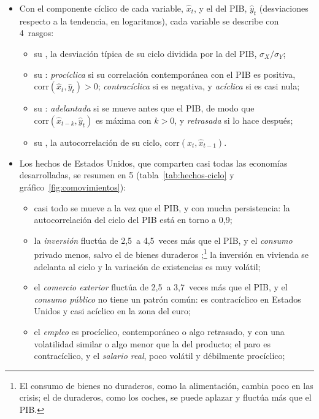\documentclass[11pt]{article}
\begin{document}
\begin{itemize}
\item Con el componente cíclico de cada variable, $\hat x_t$, y el del PIB, $\hat y_t$ (desviaciones respecto a la tendencia, en logaritmos), cada variable se describe con 4~rasgos:
  \begin{itemize}
  \item su , la desviación típica de su ciclo dividida por la del PIB, $\sigma_X/\sigma_Y$;
  \item su : \emph{procíclica} si su correlación contemporánea con el PIB es positiva, $\mathrm{corr}(\hat x_t,\hat y_t)>0$; \emph{contracíclica} si es negativa, y \emph{acíclica} si es casi nula;
  \item su : \emph{adelantada} si se mueve antes que el PIB, de modo que $\mathrm{corr}(\hat x_{t-k},\hat y_t)$ es máxima con $k>0$, y \emph{retrasada} si lo hace después;
  \item su , la autocorrelación de su ciclo, $\mathrm{corr}(\hat x_t,\hat x_{t-1})$.
  \end{itemize}
\item Los hechos de Estados Unidos, que comparten casi todas las economías desarrolladas\nocite{StockWatson1999Ciclo}, se resumen en 5 (tabla~\ref{tab:hechos-ciclo} y gráfico~\ref{fig:comovimientos}):
  \begin{itemize}
  \item casi todo se mueve a la vez que el PIB, y con mucha persistencia: la autocorrelación del ciclo del PIB está en torno a 0,9;
  \item la \emph{inversión} fluctúa de 2,5~a 4,5~veces más que el PIB, y el \emph{consumo} privado menos, salvo el de bienes duraderos  ;\footnote{El consumo de bienes no duraderos, como la alimentación, cambia poco en las crisis; el de duraderos, como los coches, se puede aplazar y fluctúa más que el PIB.} la inversión en vivienda se adelanta al ciclo y la variación de existencias es muy volátil;
  \item el \emph{comercio exterior} fluctúa de 2,5~a 3,7~veces más que el PIB, y el \emph{consumo público} no tiene un patrón común: es contracíclico en Estados Unidos y casi acíclico en la zona del euro;
  \item el \emph{empleo} es procíclico, contemporáneo o algo retrasado, y con una volatilidad similar o algo menor que la del producto; el paro es contracíclico, y el \emph{salario real}, poco volátil y débilmente procíclico;

\end{itemize}
\end{itemize}
\end{document}
